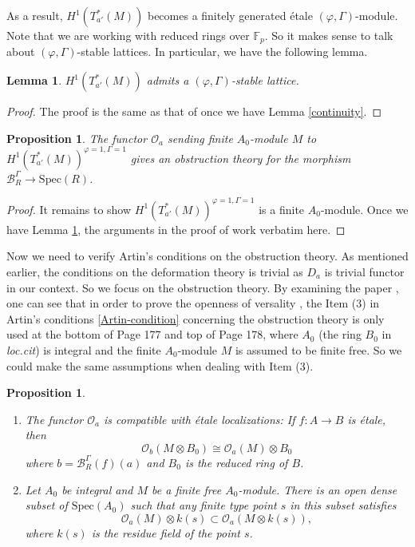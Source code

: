\documentclass[10pt]{article}
\newtheorem{prop}[thm]{Proposition}
\newtheorem{lem}[thm]{Lemma}
\numberwithin{equation}{section}
\newcommand{\bF}{{\mathbb F}}
\newcommand{\calB}{{\mathcal B}}
\newcommand{\calO}{{\mathcal O}}
\newcommand{\Spec}{{\mathrm{Spec}}}         %
\begin{document}
As a result, $H^1(T^*_{a'}(M))$ becomes a finitely generated \'etale $(\varphi,\Gamma)$-module. Note that we are working with reduced rings over $\bF_p$. So it makes sense to talk about $(\varphi,\Gamma)$-stable lattices. In particular, we have the following lemma.

\begin{lem}\label{lattice}
    $H^1(T^*_{a'}(M))$ admits a $(\varphi,\Gamma)$-stable lattice.
\end{lem}
\begin{proof}
    The proof is the same as that of \cite[Lemma 5.1.5]{EG22} once we have Lemma \ref{continuity}.
\end{proof}

\begin{prop}
    The functor $\calO_a$ sending finite $A_0$-module $M$ to $H^1(T^*_{a'}(M))^{\varphi=1,\Gamma=1}$ gives an obstruction theory for the morphism $\calB^{\Gamma}_R\to \Spec(R)$.
\end{prop}
\begin{proof}
    It remains to show $H^1(T^*_{a'}(M))^{\varphi=1,\Gamma=1}$ is a finite $A_0$-module. Once we have Lemma \ref{lattice}, the arguments in the proof of \cite[Theorem 5.1.22(1)]{EG22} work verbatim here. 
\end{proof}


Now we need to verify Artin's conditions on the obstruction theory. As mentioned earlier, the conditions on the deformation theory is trivial as $D_a$ is trivial functor in our context. So we focus on the obstruction theory. By examining the paper \cite{Art74}, one can see that in order to prove the openness of versality \cite[Theorem 4.4]{Art74}, the Item (3) in Artin's conditions \ref{Artin-condition} concerning the obstruction theory is only used at the bottom of Page 177 and top of Page 178, where $A_0$ (the ring $B_0$ in \textit{loc.cit}) is integral and the finite $A_0$-module $M$ is assumed to be finite free. So we could make the same assumptions when dealing with Item (3).

\begin{prop}\label{obstruction-theory-valid}
    \begin{enumerate}
        \item The functor $\calO_a$ is compatible with \'etale localizations: If $f:A\to B$ is \'etale, then
        \[
        \calO_b(M\otimes B_0)\cong \calO_a(M)\otimes B_0
        \]
        where $b=\calB^{\Gamma}_R(f)(a)$ and $B_0$ is the reduced ring of $B$.
        \item Let $A_0$ be integral and $M$ be a finite free $A_0$-module. There is an open dense subset of $\Spec(A_0)$ such that any finite type point $s$ in this subset satisfies
        \[
        \calO_a(M)\otimes k(s)\subset \calO_a(M\otimes k(s)),
        \]
        where $k(s)$ is the residue field of the point $s$.
    \end{enumerate}
\end{prop}
\end{document}
